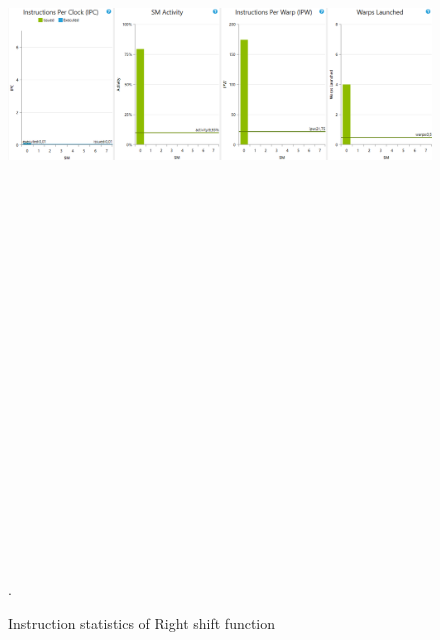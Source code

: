 \documentclass[oneside,openright,12pt,final,en]{mgr}
\begin{document}
\begin{figure}[H]
	\centering
	\includegraphics[width=\textwidth, height=26cm,keepaspectratio]{rightshift_instructions}.
	\caption{Instruction statistics of Right shift function}
	\label{fig:rightshift_instructions}
\end{figure}
\end{document}
